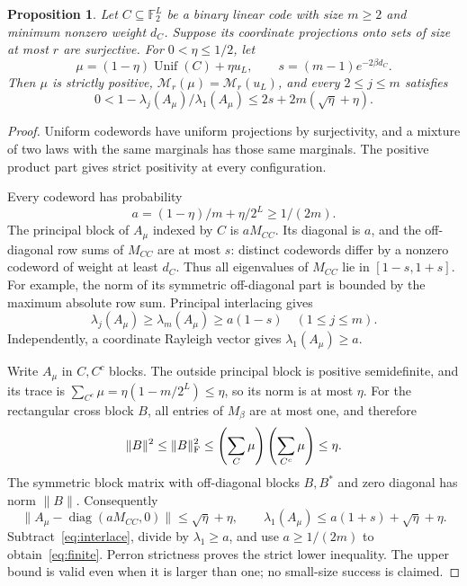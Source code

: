 \documentclass[11pt]{article}
\newtheorem{proposition}[theorem]{Proposition}
\newcommand{\F}{\mathbb F}
\newcommand{\diag}{\operatorname{diag}}
\newcommand{\Unif}{\operatorname{Unif}}
\begin{document}
\begin{proposition}\label{prop:finite}
Let $C\subseteq\F_2^L$ be a binary linear code with size $m\ge2$ and
minimum nonzero weight $d_C$. Suppose its coordinate projections onto
sets of size at most $r$ are surjective. For $0<\eta\le1/2$, let
\begin{equation}\label{eq:mixture}
 \mu=(1-\eta)\Unif(C)+\eta u_L,
 \qquad s=(m-1)e^{-2\beta d_C}.
\end{equation}
Then $\mu$ is strictly positive, $\mathcal M_r(\mu)=\mathcal M_r(u_L)$,
and every $2\le j\le m$ satisfies
\begin{equation}\label{eq:finite}
 0<1-\lambda_j(A_\mu)/\lambda_1(A_\mu)
       \le 2s+2m(\sqrt\eta+\eta).
\end{equation}
\end{proposition}
\begin{proof}
Uniform codewords have uniform projections by surjectivity, and a mixture
of two laws with the same marginals has those same marginals. The positive
product part gives strict positivity at every configuration.

Every codeword has probability
\[
 a=(1-\eta)/m+\eta/2^L\ge1/(2m).
\]
The principal block of $A_\mu$ indexed by $C$ is $aM_{CC}$. Its diagonal
is $a$, and the off-diagonal row sums of $M_{CC}$ are at most $s$:
distinct codewords differ by a nonzero codeword of weight at least $d_C$.
Thus all eigenvalues of $M_{CC}$ lie in $[1-s,1+s]$. For example, the
norm of its symmetric off-diagonal part is bounded by the maximum
absolute row sum. Principal interlacing gives
\begin{equation}\label{eq:interlace}
 \lambda_j(A_\mu)\ge\lambda_m(A_\mu)\ge a(1-s)
       \quad(1\le j\le m).
\end{equation}
Independently, a coordinate Rayleigh vector gives $\lambda_1(A_\mu)\ge a$.

Write $A_\mu$ in $C,C^c$ blocks. The outside principal block is positive
semidefinite, and its trace is
$\sum_{C^c}\mu=\eta(1-m/2^L)\le\eta$, so its norm is at most $\eta$.
For the rectangular cross block $B$, all entries of $M_\beta$ are at most
one, and therefore
\[
 \|B\|^2\le\|B\|_{\rm F}^2
 \le\left(\sum_C\mu\right)\left(\sum_{C^c}\mu\right)\le\eta.
\]
The symmetric block matrix with off-diagonal blocks $B,B^*$ and zero
diagonal has norm $\|B\|$. Consequently
\[
 \bigl\|A_\mu-\diag(aM_{CC},0)\bigr\|\le\sqrt\eta+\eta,
 \qquad
 \lambda_1(A_\mu)\le a(1+s)+\sqrt\eta+\eta.
\]
Subtract~\eqref{eq:interlace}, divide by $\lambda_1\ge a$, and use
$a\ge1/(2m)$ to obtain~\eqref{eq:finite}. Perron strictness proves the
strict lower inequality. The upper bound is valid even when it is
larger than one; no small-size success is claimed.
\end{proof}
\end{document}

